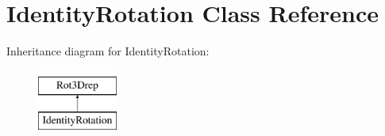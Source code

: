 \hypertarget{classIdentityRotation}{}\section{Identity\+Rotation Class Reference}
\label{classIdentityRotation}
Inheritance diagram for Identity\+Rotation\+:\begin{figure}[H]
\begin{center}
\leavevmode
\includegraphics[height=2.000000cm]{classIdentityRotation}
\end{center}
\end{figure}
